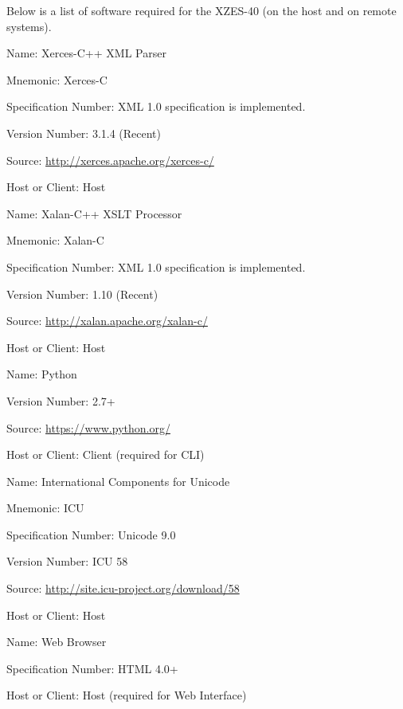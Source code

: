 Below is a list of software required for the XZES-40 (on the host and on remote systems).

\begin{description}
  \item {
    \begin{description}
      \item Name: Xerces-C++ XML Parser
      \item Mnemonic: Xerces-C
      \item Specification Number: XML 1.0 specification is implemented.
      \item Version Number: 3.1.4 (Recent)
      \item Source: \url{http://xerces.apache.org/xerces-c/}
      \item Host or Client: Host
    \end{description}
  }
  \item {
    \begin{description}
      \item Name: Xalan-C++ XSLT Processor 
      \item Mnemonic: Xalan-C
      \item Specification Number: XML 1.0 specification is implemented.
      \item Version Number: 1.10 (Recent)
      \item Source: \url{http://xalan.apache.org/xalan-c/}
      \item Host or Client: Host
    \end{description}
  }
  \item {
    \begin{description}
      \item Name: Python
      \item Version Number: 2.7+
      \item Source: \url{https://www.python.org/}
      \item Host or Client: Client (required for CLI)
    \end{description}
  }
  \item {
    \begin{description}
      \item Name: International Components for Unicode
      \item Mnemonic: ICU
      \item Specification Number: Unicode 9.0
      \item Version Number: ICU 58
      \item Source: \url{http://site.icu-project.org/download/58}
      \item Host or Client: Host
    \end{description}
  }
  \item {
    \begin{description}
      \item Name: Web Browser
      \item Specification Number: HTML 4.0+
      \item Host or Client: Host (required for Web Interface)
    \end{description}
  }
\end{description}


